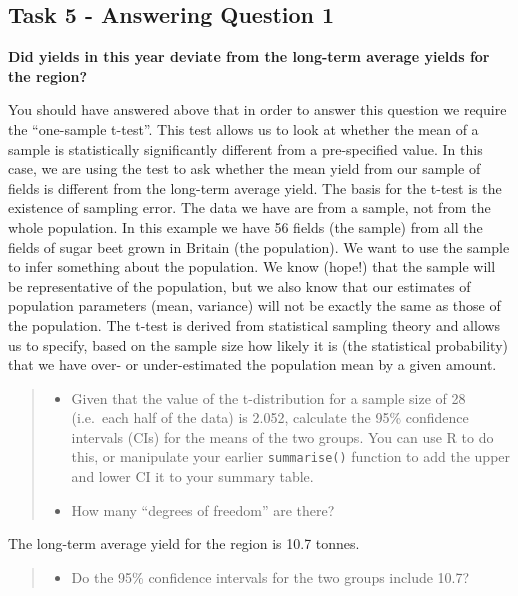 \documentclass[
]{book}
\providecommand{\tightlist}{%
  \setlength{\itemsep}{0pt}\setlength{\parskip}{0pt}}
\begin{document}
\hypertarget{task-5---answering-question-1}{%
\subsection{Task 5 - Answering Question 1}\label{task-5---answering-question-1}}

\textbf{Did yields in this year deviate from the long-term average yields for the region?}

You should have answered above that in order to answer this question we require the ``one-sample t-test''. This test allows us to look at whether the mean of a sample is statistically significantly different from a pre-specified value. In this case, we are using the test to ask whether the mean yield from our sample of fields is different from the long-term average yield. The basis for the t-test is the existence of sampling error. The data we have are from a sample, not from the whole population. In this example we have 56 fields (the sample) from all the fields of sugar beet grown in Britain (the population). We want to use the sample to infer something about the population. We know (hope!) that the sample will be representative of the population, but we also know that our estimates of population parameters (mean, variance) will not be exactly the same as those of the population. The t-test is derived from statistical sampling theory and allows us to specify, based on the sample size how likely it is (the statistical probability) that we have over- or under-estimated the population mean by a given amount.

\begin{quote}
\begin{itemize}
\tightlist
\item
  Given that the value of the t-distribution for a sample size of 28 (i.e.~each half of the data) is 2.052, calculate the 95\% confidence intervals (CIs) for the means of the two groups. You can use R to do this, or manipulate your earlier \texttt{summarise()} function to add the upper and lower CI it to your summary table.
\item
  How many ``degrees of freedom'' are there?
\end{itemize}
\end{quote}

The long-term average yield for the region is 10.7 tonnes.

\begin{quote}
\begin{itemize}
\tightlist
\item
  Do the 95\% confidence intervals for the two groups include 10.7?
\end{itemize}
\end{quote}
\end{document}
